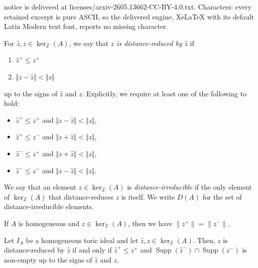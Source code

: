 \documentclass[10pt,a4paper]{amsart}
\newcommand{\NN}{\mathbb N}
\newcommand{\ZZ}{\mathbb Z}
\begin{document}
notice is delivered at licenses/arxiv-2605.13662-CC-BY-4.0.txt. Characters: every retained excerpt is pure ASCII, so the delivered engine, XeLaTeX with its default Latin Modern text font, reports no missing character.
\begin{definition}\label{def:drbouquet}
    For $\hat z,z \in \ker_{\ZZ}(A)$, we say that \textit{$z$ is distance-reduced by $\hat z$} if
    \begin{enumerate}
        \item \label{item:drbouquet1} $\hat z^+ \le z^+$
        \item \label{item:drbouquet2} $\Vert z - \hat z \Vert < \Vert z \Vert$
    \end{enumerate}
    up to the signs of $\hat z$ and $z$.
    Explicitly, we require at least one of the following to hold:
    \begin{itemize}
        \item $\hat z^+ \le z^+$ and $\Vert z - \hat z \Vert < \Vert z \Vert$,
        \item $\hat z^+ \le z^-$ and $\Vert z + \hat z \Vert < \Vert z \Vert$,
        \item $\hat z^- \le z^+$ and $\Vert z + \hat z \Vert < \Vert z \Vert$,
        \item $\hat z^- \le z^-$ and $\Vert z - \hat z \Vert < \Vert z \Vert$.
    \end{itemize}
    We say that an element $z \in \ker_\ZZ(A)$ is \textit{distance-irreducible} if the only element of $\ker_\ZZ(A)$ that distance-reduces $z$ is itself. We write $D(A)$ for the set of distance-irreducible elements.
\end{definition}

\begin{lemma} \label{lem:hompm}
    If $A$ is homogeneous and $z \in \ker_\ZZ(A)$, then we have $\lVert z^+ \rVert= \lVert z^- \rVert$.
\end{lemma}

\begin{proposition} \label{prop:drredef}
    Let $I_A$ be a homogeneous toric ideal and let $\hat z,z \in \ker_\ZZ(A)$. Then, $z$ is distance-reduced by $\hat z$ if and only if $\hat z^+ \le z^+$ and $\operatorname{Supp}(\hat z^-) \cap \operatorname{Supp}(z^-)$ is non-empty up to the signs of $\hat z$ and $z$.
\end{proposition}
\end{document}
